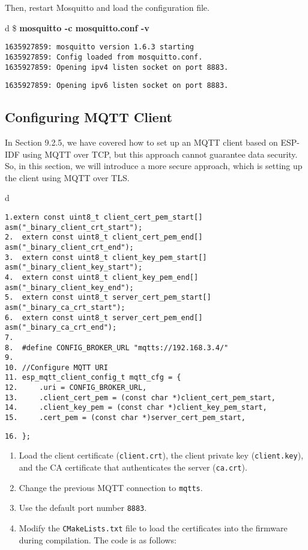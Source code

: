 \documentclass[a4paper,12pt]{book}
\begin{document}
Then, restart Mosquitto and load the configuration file.

\begin{codebloc}
\begin{tabular}{d}
\$ \textbf{mosquitto -c mosquitto.conf -v}
\begin{verbatim}
1635927859: mosquitto version 1.6.3 starting
1635927859: Config loaded from mosquitto.conf.
1635927859: Opening ipv4 listen socket on port 8883.
\end{verbatim}
\verb|1635927859: Opening ipv6 listen socket on port 8883.|
\end{tabular}
\end{codebloc}

\subsection{Configuring MQTT Client}
In Section 9.2.5, we have covered how to set up an MQTT client based on ESP-IDF using MQTT over TCP, but this approach cannot guarantee data security. So, in this section, we will introduce a more secure approach, which is setting up the client using MQTT over TLS. 

\begin{codebloc}
\begin{tabular}{d}
\vspace{2pt}
\begin{verbatim}
1.extern const uint8_t client_cert_pem_start[] asm("_binary_client_crt_start");
2.  extern const uint8_t client_cert_pem_end[] asm("_binary_client_crt_end");
3.  extern const uint8_t client_key_pem_start[] asm("_binary_client_key_start");
4.  extern const uint8_t client_key_pem_end[] asm("_binary_client_key_end");
5.  extern const uint8_t server_cert_pem_start[] asm("_binary_ca_crt_start");
6.  extern const uint8_t server_cert_pem_end[] asm("_binary_ca_crt_end");
7.
8.  #define CONFIG_BROKER_URL "mqtts://192.168.3.4/"
9.
10. //Configure MQTT URI
11. esp_mqtt_client_config_t mqtt_cfg = {
12.     .uri = CONFIG_BROKER_URL,
13.     .client_cert_pem = (const char *)client_cert_pem_start,
14.     .client_key_pem = (const char *)client_key_pem_start,
15.     .cert_pem = (const char *)server_cert_pem_start,
\end{verbatim}
\verb|16. };|
\end{tabular}
\end{codebloc}

\vspace{6pt}
\begin{enumerate}[label=(\arabic*),noitemsep]
    \item Load the client certificate (\verb|client.crt|), the client private key (\verb|client.key|), and the CA certificate that authenticates the server (\verb|ca.crt|).
    \item Change the previous MQTT connection to \verb|mqtts|.
    \item Use the default port number \verb|8883|. 
    \item Modify the \verb|CMakeLists.txt| file to load the certificates into the firmware during compilation. The code is as follows:
\end{enumerate}
\end{document}
